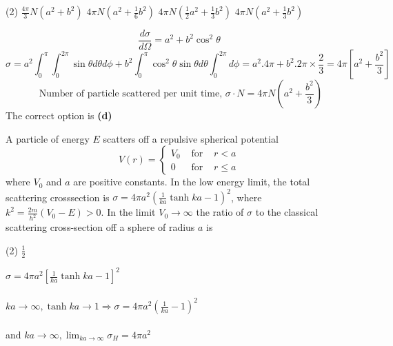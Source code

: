 \begin{enumerate}
\begin{minipage}{\textwidth}
\end{minipage}
\begin{tasks}(2)
	\task[\textbf{A.}] $\frac{4 \pi}{3} N\left(a^{2}+b^{2}\right)$
	\task[\textbf{B.}]$4 \pi N\left(a^{2}+\frac{1}{6} b^{2}\right)$
	\task[\textbf{C.}]$4 \pi N\left(\frac{1}{2} a^{2}+\frac{1}{3} b^{2}\right)$
	\task[\textbf{D.}]$4 \pi N\left(a^{2}+\frac{1}{3} b^{2}\right)$
\end{tasks}
\begin{answer}
	$$\frac{d \sigma}{d \Omega}=a^{2}+b^{2} \cos ^{2} \theta$$
	$$\sigma=a^{2} \int_{0}^{\pi} \int_{0}^{2 \pi} \sin \theta d \theta d \phi+b^{2} \int_{0}^{\pi} \cos ^{2} \theta \sin \theta d \theta \int_{0}^{2 \pi} d \phi=a^{2} .4 \pi+b^{2} .2 \pi \times \frac{2}{3}=4 \pi\left[a^{2}+\frac{b^{2}}{3}\right]$$
	$$\text { Number of particle scattered per unit time, } \sigma \cdot N=4 \pi N\left(a^{2}+\frac{b^{2}}{3}\right)$$
	The correct option is \textbf{(d)}
\end{answer}
\begin{minipage}{\textwidth}
	\item A particle of energy $E$ scatters off a repulsive spherical potential
	$$
	V(r)=\left\{\begin{array}{ccc}
	V_{0} & \text { for } & r<a \\
	0 & \text { for } & r \leq a
	\end{array}\right.
	$$
	where $V_{0}$ and $a$ are positive constants. In the low energy limit, the total scattering crosssection is $\sigma=4 \pi a^{2}\left(\frac{1}{k a} \tanh k a-1\right)^{2}$, where $k^{2}=\frac{2 m}{h^{2}}\left(V_{0}-E\right)>0$. In the limit $V_{0} \rightarrow \infty$ the ratio of $\sigma$ to the classical scattering cross-section off a sphere of radius $a$ is
\end{minipage}
\begin{tasks}(2)
	\task[\textbf{D.}]$\frac{1}{2}$
\end{tasks}
\begin{answer}
	 $\sigma=4 \pi a^{2}\left[\frac{1}{k a} \tanh k a-1\right]^{2}$\\\\
	$k a \rightarrow \infty, \tanh k a \rightarrow 1 \Rightarrow \sigma=4 \pi a^{2}\left(\frac{1}{k a}-1\right)^{2}$\\\\
	 and $k a \rightarrow \infty, \lim _{k a \rightarrow \infty} \sigma_{H}=4 \pi a^{2}$\\\\

\end{answer}
\end{enumerate}
